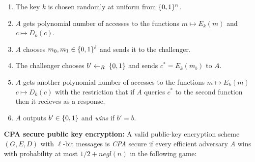 \documentclass{article}
\begin{document}
\begin{enumerate}[noitemsep,topsep=\mdcompacttopsep]%

\item{}The key $k$ is chosen randomly at uniform from $\{0,1\}^n$.%

\item{}$A$ gets polynomial number of accesses to the functions $m \mapsto E_k(m)$ and $c \mapsto D_k(c)$.%

\item{}$A$ chooses $m_0,m_1 \in \{0,1\}^\ell$ and sends it to the challenger.%

\item{}The challenger chooses $b'\leftarrow_R\;\{0,1\}$ and sends $c^* = E_k(m_b)$ to $A$.%

\item{}$A$ gets another polynomial number of accesses to the functions $m \mapsto E_k(m)$ $c \mapsto D_k(c)$ with the restriction that if $A$ queries $c^*$ to the second function then it recieves  as a response.%

\item{}$A$ outputs $b'\in\{0,1\}$ and \emph{wins} if $b'=b$.%
\end{enumerate}%

\noindent{}\textbf{CPA secure public key encryption:}
A valid public-key encryption scheme $(G,E,D)$ with  $\ell$-bit messages
is \emph{CPA} secure if  every efficient adversary $A$ wins with probability at most $1/2+negl(n)$ in the following game:%
\end{document}
